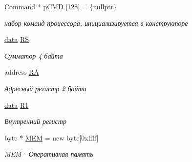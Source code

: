 \begin{DoxyCompactItemize}
\hypertarget{class_computer_a297a9b79381a9f2005c574f09ea73d70}{}\label{class_computer_a297a9b79381a9f2005c574f09ea73d70} 
\hyperlink{class_command}{Command} $\ast$ \hyperlink{class_computer_a297a9b79381a9f2005c574f09ea73d70}{p\+C\+MD} \mbox{[}128\mbox{]} = \{nullptr\}
\begin{DoxyCompactList}\small\item\em набор команд процессора, инициализируется в конструкторе \end{DoxyCompactList}\item 
\hypertarget{class_computer_a874503110664b3cf821118d2ce9c2b96}{}\label{class_computer_a874503110664b3cf821118d2ce9c2b96} 
\hyperlink{union_computer_1_1data}{data} \hyperlink{class_computer_a874503110664b3cf821118d2ce9c2b96}{RS}
\begin{DoxyCompactList}\small\item\em Сумматор 4 байта \end{DoxyCompactList}\item 
\hypertarget{class_computer_a499d0b2c857c2977dd5702906705f79e}{}\label{class_computer_a499d0b2c857c2977dd5702906705f79e} 
address \hyperlink{class_computer_a499d0b2c857c2977dd5702906705f79e}{RA}
\begin{DoxyCompactList}\small\item\em Адресный регистр 2 байта \end{DoxyCompactList}\item 
\hypertarget{class_computer_a0fbf84599b7db9d634a92afed443ee73}{}\label{class_computer_a0fbf84599b7db9d634a92afed443ee73} 
\hyperlink{union_computer_1_1data}{data} \hyperlink{class_computer_a0fbf84599b7db9d634a92afed443ee73}{R1}
\begin{DoxyCompactList}\small\item\em Внутренний регистр \end{DoxyCompactList}\item 
byte $\ast$ \hyperlink{class_computer_adcd1bd438b7ad95f043db2acbbd864ae}{M\+EM} = new byte\mbox{[}0xffff\mbox{]}
\begin{DoxyCompactList}\small\item\em M\+EM -\/ Оперативная память \end{DoxyCompactList}\end{DoxyCompactItemize}
